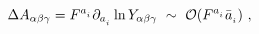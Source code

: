 \begin{equation}
\Delta A_{\alpha \beta \gamma}= F^{a_{_i}} \partial_{a_{_i}} 
\ln Y_{\alpha \beta \gamma}~\sim ~ {\cal O}(F^{a_{_i}} \bar a_{_i})~, 
\end{equation}

